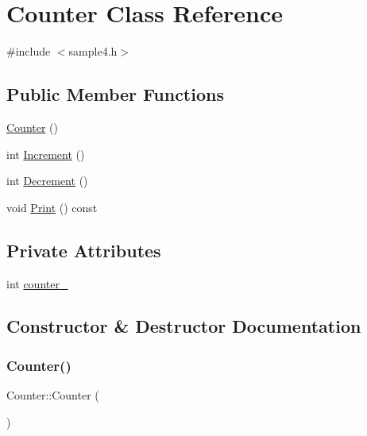 \hypertarget{classCounter}{}\section{Counter Class Reference}
\label{classCounter}


{\ttfamily \#include $<$sample4.\+h$>$}

\subsection*{Public Member Functions}
\begin{DoxyCompactItemize}
\item 
\hyperlink{classCounter_a1e05f69b5240fbab3e7ab351672167f0}{Counter} ()
\item 
int \hyperlink{classCounter_a0a0ca9fdb580a2aec9a5a62ebed2b5ab}{Increment} ()
\item 
int \hyperlink{classCounter_aa58d9b4f0bd96fc2331234493eb21bed}{Decrement} ()
\item 
void \hyperlink{classCounter_a80092ec2a0deea0870b2e9f8ad0906bd}{Print} () const
\end{DoxyCompactItemize}
\subsection*{Private Attributes}
\begin{DoxyCompactItemize}
\item 
int \hyperlink{classCounter_abdef0bf73f0a68177863c42c6eba2fc0}{counter\+\_\+}
\end{DoxyCompactItemize}


\subsection{Constructor \& Destructor Documentation}
\mbox{\label{classCounter_a1e05f69b5240fbab3e7ab351672167f0}} 
\subsubsection{\texorpdfstring{Counter()}{Counter()}}
{\footnotesize\ttfamily Counter\+::\+Counter (\begin{DoxyParamCaption}{ }\end{DoxyParamCaption})\hspace{0.3cm}{\ttfamily [inline]}}




